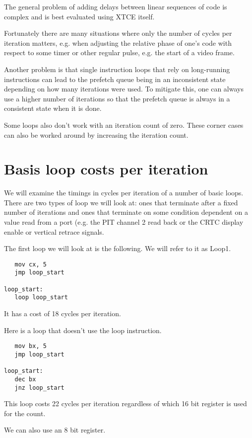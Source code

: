 \documentclass[a4paper,10pt]{amsart}
\begin{document}
The general problem of adding delays between linear sequences of code is
complex and is best evaluated using XTCE itself.

Fortunately there are many situations where only the number of cycles per
iteration matters, e.g. when adjusting the relative phase of one's code with
respect to some timer or other regular pulse, e.g. the start of a video frame.

Another problem is that single instruction loops that rely on long-running
instructions can lead to the prefetch queue being in an inconsistent state
depending on how many iterations were used. To mitigate this, one can always
use a higher number of iterations so that the prefetch queue is always in a
consistent state when it is done.

Some loops also don't work with an iteration count of zero. These corner
cases can also be worked around by increasing the iteration count.

\section{Basis loop costs per iteration}

We will examine the timings in cycles per iteration of a number of basic
loops. There are two types of loop we will look at: ones that terminate after
a fixed number of iterations and ones that terminate on some condition
dependent on a value read from a port (e.g. the PIT channel 2 read back or
the CRTC display enable or vertical retrace signals.

The first loop we will look at is the following. We will refer to it as Loop1.

\begin{lstlisting}
   mov cx, 5
   jmp loop_start

loop_start:
   loop loop_start
\end{lstlisting}

It has a cost of 18 cycles per iteration.

Here is a loop that doesn't use the loop instruction.

\begin{lstlisting}
   mov bx, 5
   jmp loop_start

loop_start:
   dec bx
   jnz loop_start
\end{lstlisting}

This loop costs 22 cycles per iteration regardless of which 16 bit register is
used for the count.

We can also use an 8 bit register.
\end{document}
